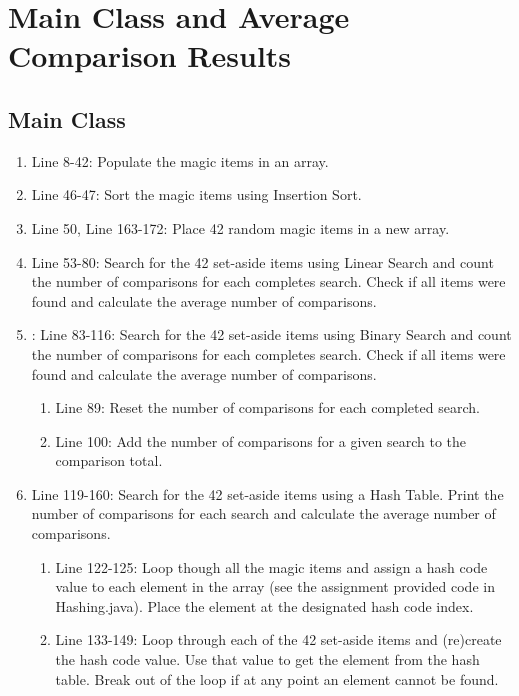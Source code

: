 \documentclass[letterpaper, 10pt,DIV=13]{scrartcl}
\numberwithin{equation}{section} %
\numberwithin{figure}{section} %
\numberwithin{table}{section} %
\begin{document}
\section{Main Class and Average Comparison Results}

\subsection{Main Class}

\begin{enumerate}
    \item Line 8-42: Populate the magic items in an array.
    \item Line 46-47: Sort the magic items using Insertion Sort.
    \item Line 50, Line 163-172: Place 42 random magic items in a new array.
    \item Line 53-80: Search for the 42 set-aside items using Linear Search and count the number of comparisons for each completes search. Check if all items were found and calculate the average number of comparisons.
    \item: Line 83-116: Search for the 42 set-aside items using Binary Search and count the number of comparisons for each completes search. Check if all items were found and calculate the average number of comparisons.
    \begin{enumerate}
        \item Line 89: Reset the number of comparisons for each completed search.
        \item Line 100: Add the number of comparisons for a given search to the comparison total.
    \end{enumerate}
    \item Line 119-160: Search for the 42 set-aside items using a Hash Table. Print the number of comparisons for each search and calculate the average number of comparisons.
    \begin{enumerate}
        \item Line 122-125: Loop though all the magic items and assign a hash code value to each element in the array (see the assignment provided code in Hashing.java). Place the element at the designated hash code index.
        \item Line 133-149: Loop through each of the 42 set-aside items and (re)create the hash code value. Use that value to get the element from the hash table. Break out of the loop if at any point an element cannot be found.
    \end{enumerate}
\end{enumerate}
\end{document}
